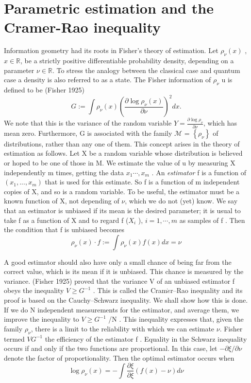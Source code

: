 \section{Parametric estimation and the Cramer-Rao inequality}
 Information geometry had its roots in Fisher’s theory of estimation. Let $
\rho_{\nu}(x)$
,$x \in \mathbb{R}$, be a strictly positive differentiable probability density, depending on a
parameter 
$\nu \in \mathbb{R}.$ To stress the analogy between the classical case and quantum
case a density is also referred to as a state. The Fisher information of $
\rho_{\nu}$
u is defined
to be (Fisher 1925)
\begin{equation*}G := \int
\rho_{\nu}(x)
\left( \frac{\partial \log
\rho_{\nu}(x)} 
{\partial \nu} \right)
^{2}
dx.\end{equation*}
We note that this is the variance of the random variable $Y =\frac{ \partial \log \rho_{\nu}}{ \partial \nu}$, which has
mean zero. Furthermore, G is associated with the family $\mathcal{M}$ = $\left\lbrace
\rho_{\nu} \right\rbrace$ of distributions,
rather than any one of them. This concept arises in the theory of estimation as
follows. Let X be a random variable whose distribution is believed or hoped to be
one of those in M. We estimate the value of 
u by measuring X independently m
times, getting the data $x_1 \cdots, x_m$ . An \textit{estimator} f is a function of $(x_1 , . . . , x_m )$
that is used for this estimate. So f is a function of m independent copies of X, and
so is a random variable. To be useful, the estimator must be a known function of
X, not depending of 
$\nu$, which we do not (yet) know. We say that an estimator is
unbiased if its mean is the desired parameter; it is usual to take f as a function of
X and to regard f ($X_{i}$ ), $i = 1, \cdots , m$ as samples of f . Then the condition that f is
unbiased becomes
\begin{equation*}
 \rho_{\nu}(x)\cdot f := \int \rho_{\nu}(x) f(x) dx = \nu
\end{equation*}

A good estimator should also have only a small chance of being far from the correct
value, which is its mean if it is unbiased. This chance is measured by the variance.
(Fisher 1925) proved that the variance V of an unbiased estimator f obeys the
inequality $V \geq G^{-1}$ . This is called the Cram$\grave{e}$r–Rao inequality and its proof is
based on the Cauchy–Schwarz inequality. We shall show how this is done.
If we do N independent measurements for the estimator, and average them, we
improve the inequality to $V \geq G^{-1}$ /N . This inequality expresses that, given the
family $
\rho_{\nu}$, there is a limit to the reliability with which we can estimate 
$\nu$. Fisher
termed $VG^{−1}$ the efficiency of the estimator f . Equality in the Schwarz inequality
occurs if and only if the two functions are proportional. In this case, let −$\partial \xi /\partial \nu$
denote the factor of proportionality. Then the optimal estimator occurs when
\begin{equation*}
 \log \rho_{\nu}(x) = - \int \frac{\partial \xi}{\partial \xi}(f(x) - \nu) d\nu
\end{equation*}

